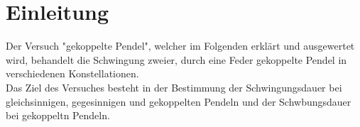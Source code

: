 \section{Einleitung}
\label{sec:Einleitung}
Der Versuch "gekoppelte Pendel", welcher im Folgenden erklärt und ausgewertet wird, behandelt
die Schwingung zweier, durch eine Feder gekoppelte Pendel in verschiedenen Konstellationen.
\\
Das Ziel des Versuches besteht in der Bestimmung der Schwingungsdauer bei gleichsinnigen, gegesinnigen und gekoppelten Pendeln
und der Schwbungsdauer bei gekoppeltn Pendeln.
